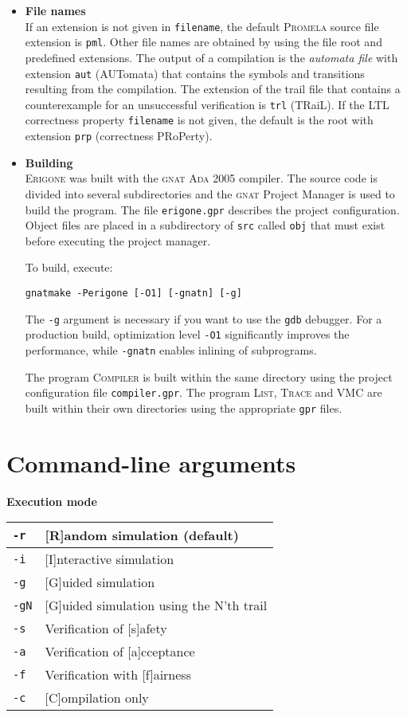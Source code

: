 \documentclass[11pt]{article}
\newcommand*{\prg}{\textsc{Erigone}}
\newcommand*{\trc}{\textsc{Trace}}
\newcommand*{\lst}{\textsc{List}}
\newcommand*{\vmc}{\textsc{VMC}}
\newcommand*{\cmp}{\textsc{Compiler}}
\newcommand*{\prm}{\textsc{Promela}}
\newcommand*{\ada}{\textsc{Ada 2005}}
\newcommand*{\gnat}{\textsc{gnat}}
\newcommand*{\p}[1]{\texttt{#1}}
\begin{document}
\begin{itemize}
\item \textbf{File names}\\
If an extension is not given in \p{filename}, the default \prm{} source
file extension is \p{pml}. Other file names are obtained by using the
file root and predefined extensions. The output of a compilation is the
\emph{automata file} with extension \p{aut} (AUTomata) that contains the
symbols and transitions resulting from the compilation. The extension of
the trail file that contains a counterexample for an unsuccessful
verification is \p{trl} (TRaiL). If the LTL correctness property
\p{filename} is not given, the default is the root with extension
\p{prp} (correctness PRoPerty).

\item \textbf{Building}\\
\prg{} was built with the \gnat{} \ada{} compiler. The source code is
divided into several subdirectories and the \gnat{} Project Manager is
used to build the program. The file \p{erigone.gpr} describes the
project configuration. Object files are placed in a subdirectory of
\p{src} called \p{obj} that must exist before executing the project
manager.

To build, execute:
\begin{verbatim}
gnatmake -Perigone [-O1] [-gnatn] [-g]
\end{verbatim}

The \p{-g} argument is necessary if you want to use the \p{gdb}
debugger. For a production build, optimization level \p{-O1}
significantly improves the performance, while \p{-gnatn} enables
inlining of subprograms.

The program \cmp{} is built within the same directory using the project
configuration file \p{compiler.gpr}. The program \lst{}, \trc{} and
\vmc{} are built within their own directories using the appropriate
\p{gpr} files.

\end{itemize}

\section{Command-line arguments}

\textbf{Execution mode}
\begin{center}
\begin{tabular}{|l|p{}|}
\hline
\p{-r} & [R]andom simulation (default)\\\hline
\p{-i} & [I]nteractive simulation\\\hline
\p{-g} & [G]uided simulation\\\hline
\p{-gN} & [G]uided simulation using the N'th trail\\\hline\hline
\p{-s} & Verification of [s]afety\\\hline
\p{-a} & Verification of [a]cceptance\\\hline
\p{-f} & Verification with [f]airness\\\hline\hline
\p{-c} & [C]ompilation only\\\hline
\end{tabular}
\end{center}
\end{document}
